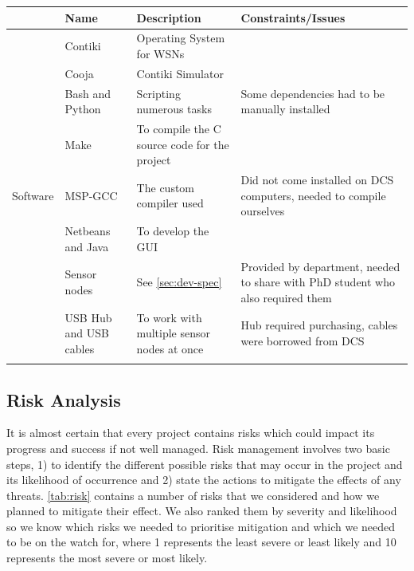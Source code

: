 \begin{table}[H]
\centering
\begin{tabular}{| l | p{2.5cm} | p{4.5cm} | p{4.25cm} |}
	\hline
	~ & Name & Description & Constraints/Issues\\
	\hline

	\multirow{13}{*}{Software} & Contiki & Operating System for WSNs & ~
	
	\\ \cline{2-4}

	& Cooja & Contiki Simulator & ~
	
	\\ \cline{2-4}

	& Bash and Python & Scripting numerous tasks & Some dependencies had to be manually installed\\ 
	\cline{2-4}

	& Make & To compile the C source code for the project & ~\\ 
	\cline{2-4}

	& MSP-GCC & The custom compiler used & Did not come installed on DCS computers, needed to compile ourselves\\ 
	\cline{2-4}

	& Netbeans and Java & To develop the GUI & ~\\ 
	\hline

	\multirow{7}{*}{Hardware} & Sensor nodes & See \autoref{sec:dev-spec} & Provided by department, needed to share with PhD student who also required them\\ 
	\cline{2-4}

	& USB Hub and USB cables & To work with multiple sensor nodes at once & Hub required purchasing, cables were borrowed from DCS\\
	\cline{2-4}
	
	\hline
\end{tabular}
\end{table}


\subsection{Risk Analysis}
It is almost certain that every project contains risks which could impact its progress and success if not well managed. Risk management involves two basic steps, 1) to identify the different possible risks that may occur in the project and its likelihood of occurrence and 2) state the actions to mitigate the effects of any threats. \autoref{tab:risk} contains a number of risks that we considered and how we planned to mitigate their effect. We also ranked them by severity and likelihood so we know which risks we needed to prioritise mitigation and which we needed to be on the watch for, where 1 represents the least severe or least likely and 10 represents the most severe or most likely.

